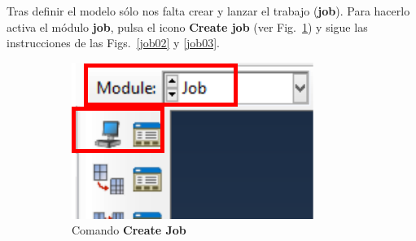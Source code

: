   Tras definir el modelo sólo nos falta crear y lanzar el trabajo
  (\textbf{job}). Para hacerlo activa el módulo \textbf{job}, pulsa el
  icono \textbf{Create job} (ver Fig.~\ref{job01}) y sigue las
  instrucciones de las Figs.~\ref{job02} y \ref{job03}.
  \begin{figure}[!h]
    \centering
    \begin{subfigure}[!h]{0.21\textwidth}
      \includegraphics[width=\textwidth]{./body/images/job01.pdf}
      \caption{Comando \textbf{Create Job}}
      \label{job01}
    \end{subfigure}%
    ~ %
    \begin{subfigure}[!h]{0.32\textwidth}

\end{subfigure}
\end{figure}

